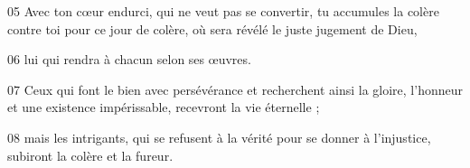 
05 Avec ton cœur endurci, qui ne veut pas se convertir, tu accumules la colère contre toi pour ce jour de colère, où sera révélé le juste jugement de Dieu,

06 lui qui rendra à chacun selon ses œuvres.

07 Ceux qui font le bien avec persévérance et recherchent ainsi la gloire, l’honneur et une existence impérissable, recevront la vie éternelle ;

08 mais les intrigants, qui se refusent à la vérité pour se donner à l’injustice, subiront la colère et la fureur.
